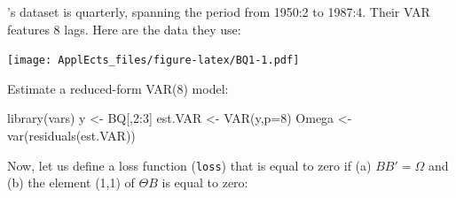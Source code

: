 \documentclass[
  12pt,
]{book}
\newenvironment{Shaded}{\begin{snugshade}}{\end{snugshade}}
\newcommand{\AttributeTok}[1]{\textcolor[rgb]{0.77,0.63,0.00}{#1}}
\newcommand{\DecValTok}[1]{\textcolor[rgb]{0.00,0.00,0.81}{#1}}
\newcommand{\FunctionTok}[1]{\textcolor[rgb]{0.00,0.00,0.00}{#1}}
\newcommand{\NormalTok}[1]{#1}
\newcommand{\OtherTok}[1]{\textcolor[rgb]{0.56,0.35,0.01}{#1}}
\newcommand{\SpecialCharTok}[1]{\textcolor[rgb]{0.00,0.00,0.00}{#1}}
\newcommand{\StringTok}[1]{\textcolor[rgb]{0.31,0.60,0.02}{#1}}
\theoremstyle{definition}
\theoremstyle{definition}
\theoremstyle{definition}
\theoremstyle{definition}
\theoremstyle{remark}
\begin{document}
\citet{Blanchard_Quah_1989}'s dataset is quarterly, spanning the period from 1950:2 to 1987:4. Their VAR features 8 lags. Here are the data they use:

\begin{Shaded}
\end{Shaded}

\texttt{[image: ApplEcts\_files/figure-latex/BQ1-1.pdf]}

Estimate a reduced-form VAR(8) model:

\begin{Shaded}
\begin{Highlighting}[]
\FunctionTok{library}\NormalTok{(vars)}
\NormalTok{y }\OtherTok{\textless{}{-}}\NormalTok{ BQ[,}\DecValTok{2}\SpecialCharTok{:}\DecValTok{3}\NormalTok{]}
\NormalTok{est.VAR }\OtherTok{\textless{}{-}} \FunctionTok{VAR}\NormalTok{(y,}\AttributeTok{p=}\DecValTok{8}\NormalTok{)}
\NormalTok{Omega }\OtherTok{\textless{}{-}} \FunctionTok{var}\NormalTok{(}\FunctionTok{residuals}\NormalTok{(est.VAR))}
\end{Highlighting}
\end{Shaded}

Now, let us define a loss function (\texttt{loss}) that is equal to zero if (a) \(BB'=\Omega\) and (b) the element (1,1) of \(\Theta B\) is equal to zero:
\end{document}
